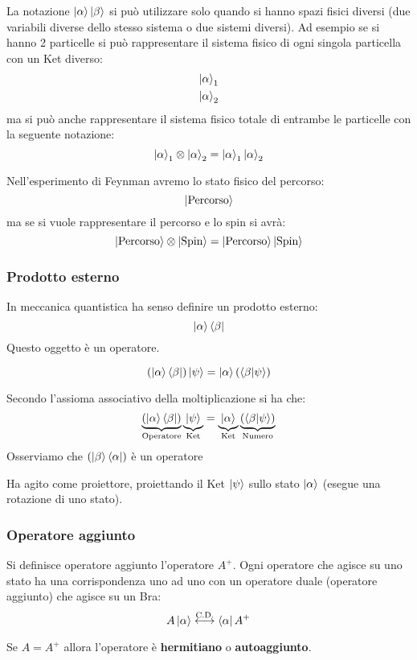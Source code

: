 \documentclass[a4paper]{article}
\begin{document}
\noindent
La notazione \( \ket{\alpha} \ket{\beta} \) si può utilizzare solo quando si hanno spazi fisici diversi (due variabili
diverse dello stesso sistema o due sistemi diversi). Ad esempio se si hanno 2 particelle
si può rappresentare il sistema fisico di ogni singola particella con un Ket diverso:
\[
  \begin{aligned}
    \ket{\alpha}_1\\
    \ket{\alpha}_2
  \end{aligned}
\]
ma si può anche rappresentare il sistema fisico totale di entrambe le particelle con
la seguente notazione:
\[
  \ket{\alpha}_1 \otimes \ket{\alpha}_2 = \ket{\alpha}_1 \ket{\alpha}_2
\] 

\vspace{1em}
\noindent
Nell'esperimento di Feynman avremo lo stato fisico del percorso:
\[
  \ket{\text{Percorso}}
\] 
ma se si vuole rappresentare il percorso e lo spin si avrà:
\[
  \ket{\text{Percorso}} \otimes \ket{\text{Spin}} = \ket{\text{Percorso}} \ket{\text{Spin}}
\]

\subsubsection{Prodotto esterno}
In meccanica quantistica ha senso definire un prodotto esterno:
\[
  \ket{\alpha} \bra{\beta}
\] 
Questo oggetto è un operatore.

\vspace{1em}
\noindent
\begin{theorem}
  \[
    \left( \ket{\alpha} \bra{\beta} \right)\ket{\psi} =
    \ket{\alpha} \left( \bra{\beta} \ket{\psi} \right)
  \] 
\end{theorem}
Secondo l'assioma associativo della moltiplicazione si ha che:
\[
  \underbrace{\left( \ket{\alpha} \bra{\beta} \right)}_{\text{Operatore}}
  \underbrace{\ket{\psi}}_{\text{Ket}} =
  \underbrace{\ket{\alpha}}_{\text{Ket}} 
  \underbrace{\left( \bra{\beta} \ket{\psi} \right)}_{\text{Numero}}
\] 
Osserviamo che \( \left( \ket{\beta} \bra{\alpha} \right)  \) è un operatore

Ha agito come proiettore, proiettando il Ket \( \ket{\psi} \) sullo stato \( \ket{\alpha} \)
(esegue una rotazione di uno stato).

\subsubsection{Operatore aggiunto}
\begin{definition}
  Si definisce operatore aggiunto l'operatore \( A^+ \).
  Ogni operatore che agisce su uno stato ha una corrispondenza uno ad uno con un operatore
  duale (operatore aggiunto) che agisce su un Bra:
  \[
    A \ket{\alpha} \stackrel{\text{C.D.}}{\longleftrightarrow} \bra{\alpha}A^+
  \] 

  \vspace{1em}
  \noindent
  Se \( A = A^+ \) allora l'operatore è \textbf{hermitiano} o \textbf{autoaggiunto}.
\end{definition}
\end{document}
